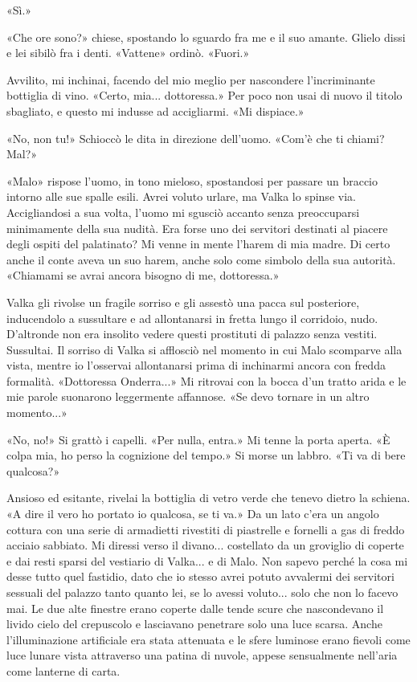 «Sì.»

«Che ore sono?» chiese, spostando lo sguardo fra me e il suo amante.
Glielo dissi e lei sibilò fra i denti. «Vattene» ordinò. «Fuori.»

Avvilito, mi inchinai, facendo del mio meglio per nascondere
l'incriminante bottiglia di vino. «Certo, mia... dottoressa.» Per poco
non usai di nuovo il titolo sbagliato, e questo mi indusse ad
accigliarmi. «Mi dispiace.»

«No, non tu!» Schioccò le dita in direzione dell'uomo. «Com'è che ti
chiami? Mal?»

«Malo» rispose l'uomo, in tono mieloso, spostandosi per passare un
braccio intorno alle sue spalle esili. Avrei voluto urlare, ma Valka lo
spinse via. Accigliandosi a sua volta, l'uomo mi sgusciò accanto senza
preoccuparsi minimamente della sua nudità. Era forse uno dei servitori
destinati al piacere degli ospiti del palatinato? Mi venne in mente
l'harem di mia madre. Di certo anche il conte aveva un suo harem, anche
solo come simbolo della sua autorità. «Chiamami se avrai ancora bisogno
di me, dottoressa.»

Valka gli rivolse un fragile sorriso e gli assestò una pacca sul
posteriore, inducendolo a sussultare e ad allontanarsi in fretta lungo
il corridoio, nudo. D'altronde non era insolito vedere questi prostituti
di palazzo senza vestiti. Sussultai. Il sorriso di Valka si afflosciò
nel momento in cui Malo scomparve alla vista, mentre io l'osservai
allontanarsi prima di inchinarmi ancora con fredda formalità.
«Dottoressa Onderra...» Mi ritrovai con la bocca d'un tratto arida e le
mie parole suonarono leggermente affannose. «Se devo tornare in un altro
momento...»

«No, no!» Si grattò i capelli. «Per nulla, entra.» Mi tenne la porta
aperta. «È colpa mia, ho perso la cognizione del tempo.» Si morse un
labbro. «Ti va di bere qualcosa?»

Ansioso ed esitante, rivelai la bottiglia di vetro verde che tenevo
dietro la schiena. «A dire il vero ho portato io qualcosa, se ti va.» Da
un lato c'era un angolo cottura con una serie di armadietti rivestiti di
piastrelle e fornelli a gas di freddo acciaio sabbiato. Mi diressi verso
il divano... costellato da un groviglio di coperte e dai resti sparsi
del vestiario di Valka... e di Malo. Non sapevo perché la cosa mi desse
tutto quel fastidio, dato che io stesso avrei potuto avvalermi dei
servitori sessuali del palazzo tanto quanto lei, se lo avessi voluto...
solo che non lo facevo mai. Le due alte finestre erano coperte dalle
tende scure che nascondevano il livido cielo del crepuscolo e lasciavano
penetrare solo una luce scarsa. Anche l'illuminazione artificiale era
stata attenuata e le sfere luminose erano fievoli come luce lunare vista
attraverso una patina di nuvole, appese sensualmente nell'aria come
lanterne di carta.

